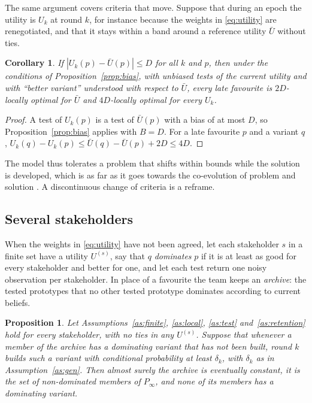 \documentclass[preprint,review,11pt,authoryear]{elsarticle}
\newtheorem{proposition}{Proposition}
\newtheorem{corollary}{Corollary}
\theoremstyle{definition}
\begin{document}
The same argument covers criteria that move. Suppose that during an epoch the utility is $U_k$ at round $k$, for instance because the weights in \eqref{eq:utility} are renegotiated, and that it stays within a band around a reference utility $\bar U$ without ties.

\begin{corollary}
\label{cor:drift}
If $|U_k(p)-\bar U(p)|\le D$ for all $k$ and $p$, then under the conditions of Proposition~\ref{prop:bias}, with unbiased tests of the current utility and with ``better variant'' understood with respect to $\bar U$, every late favourite is $2D$-locally optimal for $\bar U$ and $4D$-locally optimal for every $U_k$.
\end{corollary}

\begin{proof}
A test of $U_k(p)$ is a test of $\bar U(p)$ with a bias of at most $D$, so Proposition~\ref{prop:bias} applies with $B=D$. For a late favourite $p$ and a variant $q$, $U_k(q)-U_k(p)\le\bar U(q)-\bar U(p)+2D\le4D$.
\end{proof}

The model thus tolerates a problem that shifts within bounds while the solution is developed, which is as far as it goes towards the co-evolution of problem and solution \citep{dorstcross2001}. A discontinuous change of criteria is a reframe.

\subsection{Several stakeholders}
\label{sec:pareto}

When the weights in \eqref{eq:utility} have not been agreed, let each stakeholder $s$ in a finite set have a utility $U^{(s)}$, say that $q$ \emph{dominates} $p$ if it is at least as good for every stakeholder and better for one, and let each test return one noisy observation per stakeholder. In place of a favourite the team keeps an \emph{archive}: the tested prototypes that no other tested prototype dominates according to current beliefs.

\begin{proposition}
\label{prop:pareto}
Let Assumptions~\ref{as:finite}, \ref{as:local}, \ref{as:test} and~\ref{as:retention} hold for every stakeholder, with no ties in any $U^{(s)}$. Suppose that whenever a member of the archive has a dominating variant that has not been built, round $k$ builds such a variant with conditional probability at least $\delta_k$, with $\delta_k$ as in Assumption~\ref{as:gen}. Then almost surely the archive is eventually constant, it is the set of non-dominated members of $P_\infty$, and none of its members has a dominating variant.
\end{proposition}
\end{document}
